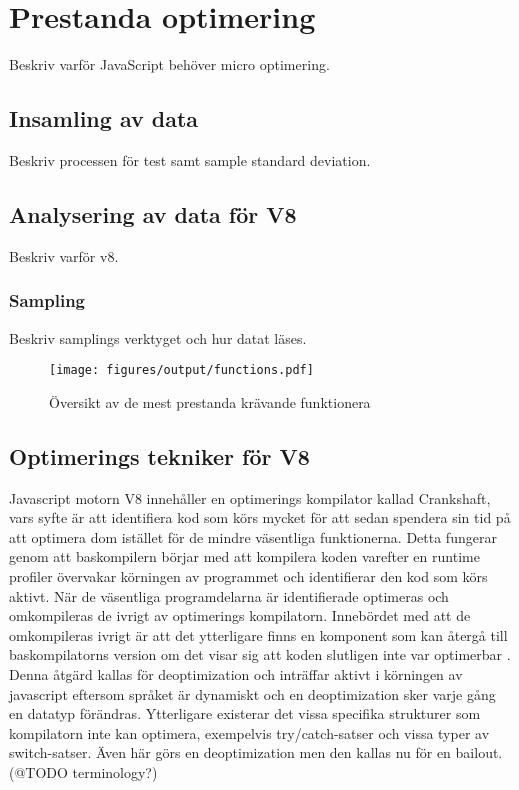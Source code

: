 \section{Prestanda optimering}

Beskriv varför JavaScript behöver micro optimering.

\subsection{Insamling av data}

Beskriv processen för test samt sample standard deviation.

\subsection{Analysering av data för V8}

Beskriv varför v8.

\subsubsection{Sampling}

Beskriv samplings verktyget och hur datat läses.

\begin{figure}[ht]
  \texttt{[image: figures/output/functions.pdf]}
  \caption{Översikt av de mest prestanda krävande funktionera}
\end{figure}

\subsection{Optimerings tekniker för V8}

Javascript motorn V8 innehåller en optimerings kompilator kallad Crankshaft,
vars syfte är att identifiera kod som körs mycket för att sedan spendera sin
tid på att optimera dom istället för de mindre väsentliga funktionerna. Detta
fungerar genom att baskompilern börjar med att kompilera koden varefter en
runtime profiler övervakar körningen av programmet och identifierar den kod
som körs aktivt. När de väsentliga programdelarna är identifierade
optimeras och omkompileras de ivrigt av optimerings kompilatorn. Innebördet
med att de omkompileras ivrigt är att det ytterligare finns en komponent som
kan återgå till baskompilatorns version om det visar sig att koden slutligen
inte var optimerbar \citep{mk10}. Denna åtgärd kallas för deoptimization och
inträffar aktivt i körningen av javascript eftersom språket är dynamiskt och
en deoptimization sker varje gång en datatyp förändras. Ytterligare existerar
det vissa specifika strukturer som kompilatorn inte kan optimera, exempelvis
try/catch-satser och vissa typer av switch-satser. Även här görs en
deoptimization men den kallas nu för en bailout. (@TODO terminology?)

